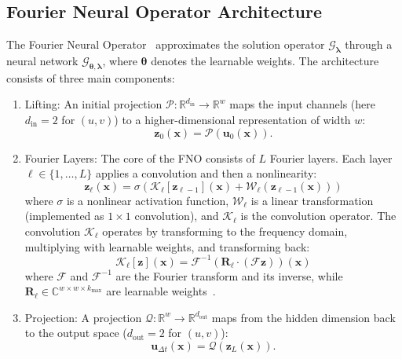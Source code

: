 \documentclass[runningheads]{llncs}
\begin{document}
\subsection{Fourier Neural Operator Architecture}
\label{sec:fno_architecture}

The Fourier Neural Operator~\cite{li2021fourierneuraloperatorparametric} approximates the solution operator $\mathcal{G}_{\bm{\lambda}}$ through a neural network $\mathcal{G}_{\bm{\theta}, \bm{\lambda}}$, where $\bm{\theta}$ denotes the learnable weights. The architecture consists of three main components:

\begin{enumerate}
    \item Lifting: An initial projection $\mathcal{P}: \mathbb{R}^{d_{\text{in}}} \rightarrow \mathbb{R}^w$ maps the input channels (here $d_{\text{in}} = 2$ for $(u,v)$) to a higher-dimensional representation of width $w$:
        \begin{equation*}
            \bm{z}_0(\bm{x}) = \mathcal{P}(\bm{u}_0(\bm{x})).
        \end{equation*}

    \item Fourier Layers: The core of the FNO consists of $L$ Fourier layers. Each layer $\ell \in \{1, \ldots, L\}$ applies a convolution and then a nonlinearity:
        \begin{equation*}
            \bm{z}_{\ell}(\bm{x}) = \sigma\left(\mathcal{K}_{\ell}[\bm{z}_{\ell-1}](\bm{x}) + \mathcal{W}_{\ell}(\bm{z}_{\ell-1}(\bm{x}))\right)
        \end{equation*}
        where $\sigma$ is a nonlinear activation function, $\mathcal{W}_{\ell}$ is a linear transformation (implemented as $1\times1$ convolution), and $\mathcal{K}_{\ell}$ is the convolution operator. The convolution $\mathcal{K}_{\ell}$ operates by transforming to the frequency domain, multiplying with learnable weights, and transforming back:
        \begin{equation*}
            \mathcal{K}_{\ell}[\bm{z}](\bm{x}) = \mathcal{F}^{-1}\left(\bm{R}_{\ell} \cdot (\mathcal{F}\bm{z})\right)(\bm{x})
        \end{equation*}
        where $\mathcal{F}$ and $\mathcal{F}^{-1}$ are the Fourier transform and its inverse, while $\bm{R}_{\ell} \in \mathbb{C}^{w \times w \times k_{\max}}$ are learnable weights~\cite{li2021fourierneuraloperatorparametric}.

    \item Projection: A projection $\mathcal{Q}: \mathbb{R}^w \rightarrow \mathbb{R}^{d_{\text{out}}}$ maps from the hidden dimension back to the output space ($d_{\text{out}} = 2$ for $(u,v)$):
        \begin{equation*}
            \bm{u}_{\Delta t}(\bm{x}) = \mathcal{Q}(\bm{z}_L(\bm{x})).
        \end{equation*}
\end{enumerate}
\end{document}

